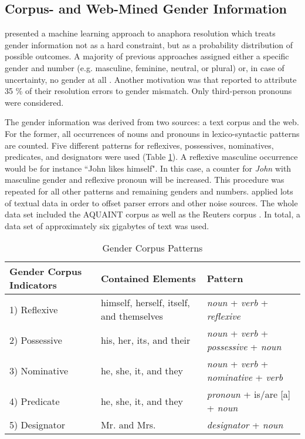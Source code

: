 \subsection{Corpus- and Web-Mined Gender Information}
\label{section:bergsma2005automatic}
\cite{bergsma2005automatic} presented a machine learning approach to anaphora resolution which treats gender information not as a hard constraint, but as a probability distribution of possible outcomes. A majority of previous approaches assigned either a specific gender and number (e.g. masculine, feminine, neutral, or plural) or, in case of uncertainty, no gender at all \citep{soon2001machine, broscheit2010bart}. Another motivation was that \cite{kennedy1996anaphora} reported to attribute 35 \% of their resolution errors to gender mismatch. Only third-person pronouns were considered.

The gender information was derived from two sources: a text corpus and the web. 
For the former, all occurrences of nouns and pronouns in lexico-syntactic patterns are counted. Five different patterns for reflexives, possessives, nominatives, predicates, and designators were used (Table \ref{table:bergsma2004GenderTable}). A reflexive masculine occurrence would be for instance ``John likes himself". In this case, a counter for \textit{John} with masculine gender and reflexive pronoun will be increased. This procedure was repeated for all other patterns and remaining genders and numbers. \cite{bergsma2005automatic} applied lots of textual data in order to offset parser errors and other noise sources. The whole data set included the AQUAINT corpus \citep{graff2002aquaint} as well as the Reuters corpus \citep{rose2002reuters}. In total, a data set of approximately six gigabytes of text was used.

\begin{table}[h]
  \caption{Gender Corpus Patterns}
    \begin{tabular}{| l | p{5cm} | p{5cm} |}
    \hline
    Gender Corpus Indicators & Contained Elements & Pattern \\ \hline
\hline
    1) Reflexive & himself, herself, itself, and themselves &  \textit{noun} + \textit{verb} + \textit{reflexive}\\ \hline
    2) Possessive & his, her, its, and their & \textit{noun} + \textit{verb} + \textit{possessive} + \textit{noun} \\ \hline
    3) Nominative & he, she, it, and they & \textit{noun} + \textit{verb} + \textit{nominative} +  \textit{verb} \\ \hline
    4) Predicate & he, she, it, and they & \textit{pronoun} + is/are [a] + \textit{noun}  \\ \hline
    5) Designator & Mr. and Mrs. & \textit{designator} + \textit{noun}\\ \hline
    \end{tabular}

     \label{table:bergsma2004GenderTable}
\end{table}

